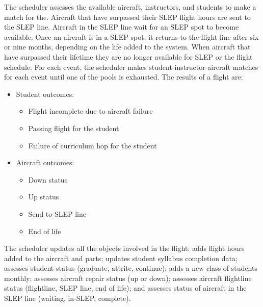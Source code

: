 \documentclass[preprint,12pt]{elsarticle}
\begin{document}
The scheduler assesses the available aircraft, instructors,
and students to make a match for the. Aircraft that have surpassed their SLEP flight hours are
sent to the SLEP line.  Aircraft in the SLEP line wait for an
SLEP spot to become available. Once an aircraft is in a SLEP spot, it
returns to the flight line after six or nine months, depending on the life
added to the system.  When aircraft that have surpassed their lifetime
they are no longer available for SLEP
or the flight schedule. For each event, the scheduler makes
student-instructor-aircraft matches for each event until one of the
pools is exhausted. The results of a flight are:
\begin{itemize}
\item Student outcomes:
  \begin{itemize}
  \item Flight incomplete due to aircraft failure
  \item Passing flight  for the student
  \item Failure of curriculum hop for the student
  \end{itemize}
\item Aircraft outcomes:
  \begin{itemize}
  \item Down status
  \item Up status
  \item Send to SLEP line
  \item End of life
  \end{itemize}
\end{itemize}

The scheduler updates all the objects involved in the flight: adds
flight hours added to the aircraft and parts; updates student syllabus
completion data; assesses student status (graduate, attrite,
continue); adds a new class of students monthly; assesses aircraft
repair status (up or down); assesses aircraft flightline status
(flightline, SLEP line, end of life); and assesses status of aircraft in
the SLEP line (waiting, in-SLEP, complete). 







\end{document}
